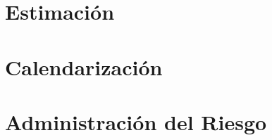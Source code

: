 \localtableofcontents
\section{Estimación}\label{sec:estimacion}


\section{Calendarización}
\label{sec:calendarizacion}


\section{Administración del Riesgo}
\label{sec:riesgos}

